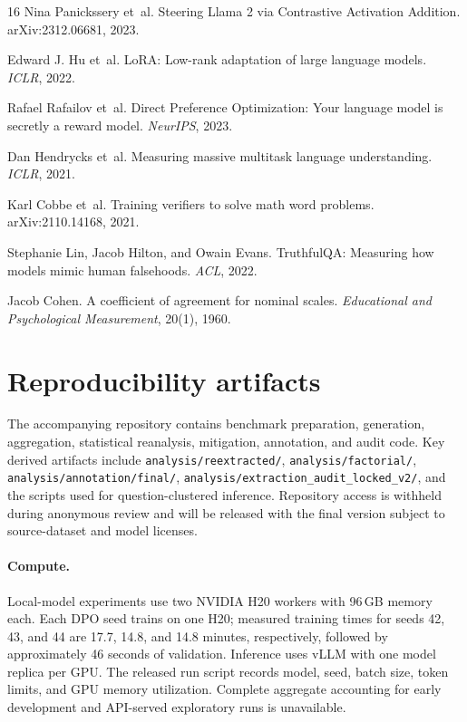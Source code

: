 \documentclass{article}
\begin{document}
{\begin{thebibliography}{16}
Nina Panickssery et~al.
\newblock Steering Llama 2 via Contrastive Activation Addition.
\newblock arXiv:2312.06681, 2023.

Edward J. Hu et~al.
\newblock LoRA: Low-rank adaptation of large language models.
\newblock \emph{ICLR}, 2022.

Rafael Rafailov et~al.
\newblock Direct Preference Optimization: Your language model is secretly a
  reward model.
\newblock \emph{NeurIPS}, 2023.

Dan Hendrycks et~al.
\newblock Measuring massive multitask language understanding.
\newblock \emph{ICLR}, 2021.

Karl Cobbe et~al.
\newblock Training verifiers to solve math word problems.
\newblock arXiv:2110.14168, 2021.

Stephanie Lin, Jacob Hilton, and Owain Evans.
\newblock TruthfulQA: Measuring how models mimic human falsehoods.
\newblock \emph{ACL}, 2022.

Jacob Cohen.
\newblock A coefficient of agreement for nominal scales.
\newblock \emph{Educational and Psychological Measurement}, 20(1), 1960.

\end{thebibliography}
}

\appendix

\section{Reproducibility artifacts}

The accompanying repository contains benchmark preparation, generation,
aggregation, statistical reanalysis, mitigation, annotation, and audit code.
Key derived artifacts include
\texttt{analysis/reextracted/},
\texttt{analysis/factorial/},
\texttt{analysis/annotation/final/},
\texttt{analysis/extraction\_audit\_locked\_v2/}, and the scripts used for
question-clustered inference. Repository access is withheld during anonymous
review and will be released with the final version subject to source-dataset
and model licenses.

\paragraph{Compute.}
Local-model experiments use two NVIDIA H20 workers with 96\,GB memory each.
Each DPO seed trains on one H20; measured training times for seeds 42, 43, and
44 are 17.7, 14.8, and 14.8 minutes, respectively, followed by approximately
46 seconds of validation. Inference uses vLLM with one model replica per GPU.
The released run script records model, seed, batch size, token limits, and GPU
memory utilization. Complete aggregate accounting for early development and
API-served exploratory runs is unavailable.
\end{document}
